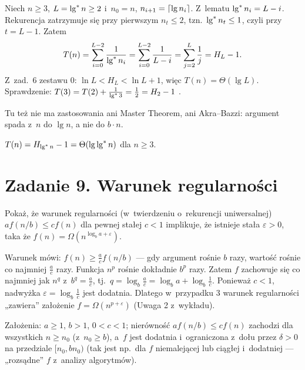 \documentclass[11pt]{article}
\begin{document}
\formalnie
Niech $n\ge3$, $L=\operatorname{lg}^{*} n\ge2$ i~$n_0=n$, $n_{i+1}=\left\lceil \operatorname{lg} n_i \right\rceil$. Z~lematu
$\operatorname{lg}^{*} n_i=L-i$. Rekurencja zatrzymuje się przy pierwszym $n_t\le2$, tzn.\
$\operatorname{lg}^{*} n_t\le1$, czyli przy $t=L-1$. Zatem
\[
T(n)=\sum_{i=0}^{L-2}\frac{1}{\operatorname{lg}^{*} n_i}=\sum_{i=0}^{L-2}\frac{1}{L-i}=\sum_{j=2}^{L}\frac1j=H_{L}-1.
\]
Z~zad.~6 zestawu 0: $\ln L<H_L<\ln L+1$, więc $T(n)=\Theta(\lg L)$.
Sprawdzenie: $T(3)=T(2)+\frac{1}{\operatorname{lg}^{*}3}=\frac12=H_2-1$ \checkmark.

\begin{uwaga}
Tu też nie ma zastosowania ani Master Theorem, ani Akra--Bazzi: argument
spada z~$n$ do $\lg n$, a nie do $b\cdot n$.
\end{uwaga}
\begin{odpowiedz}$T(n)=H_{\operatorname{lg}^{*} n}-1=\Theta(\operatorname{lg}\operatorname{lg}^{*} n)$ dla $n\ge3$.\end{odpowiedz}

\section{Zadanie 9. Warunek regularności}
\begin{tresc}
Pokaż, że warunek regularności (w~twierdzeniu o~rekurencji uniwersalnej)
$af(n/b)\le cf(n)$ dla pewnej stałej $c<1$ implikuje, że istnieje stała
$\varepsilon>0$, taka że $f(n)=\Omega(n^{\log_ba+\varepsilon})$.
\end{tresc}

\begin{intuicja}
Warunek mówi: $f(n)\ge\frac ac f(n/b)$ --- gdy argument rośnie $b$ razy,
wartość rośnie co najmniej $\frac ac$ razy. Funkcja $n^{p}$ rośnie dokładnie
$b^p$ razy. Zatem $f$ zachowuje się co najmniej jak $n^{q}$ z~$b^q=\frac ac$,
tj.\ $q=\log_b\frac ac=\log_ba+\log_b\frac1c$. Ponieważ $c<1$, nadwyżka
$\varepsilon=\log_b\frac1c$ jest dodatnia. Dlatego w~przypadku 3 warunek
regularności „zawiera” założenie $f=\Omega(n^{p+\varepsilon})$
(Uwaga 2 z~wykładu).
\end{intuicja}
\formalnie
Założenia: $a\ge1$, $b>1$, $0<c<1$; nierówność $af(n/b)\le cf(n)$ zachodzi dla
wszystkich $n\ge n_0$ (z~$n_0\ge b$), a~$f$ jest dodatnia i~ograniczona z~dołu
przez $\delta>0$ na przedziale $[n_0,bn_0)$ (tak jest np.\ dla $f$ niemalejącej
lub ciągłej i~dodatniej --- „rozsądne” $f$ z~analizy algorytmów).
\end{document}
